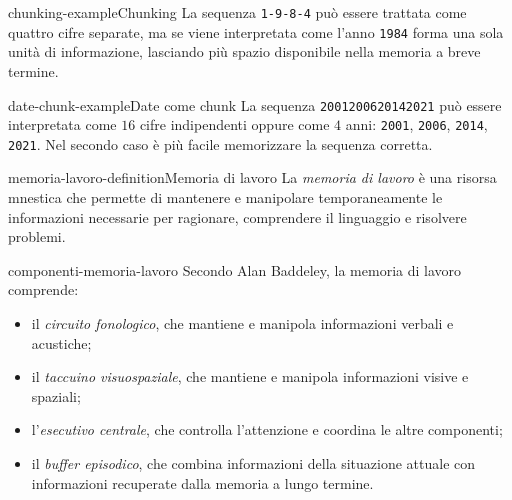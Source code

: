 \documentclass[preview]{standalone}
\begin{document}
\begin{snippetexample}{chunking-example}{Chunking}
    La sequenza \texttt{1-9-8-4} può essere trattata come quattro cifre
    separate, ma se viene interpretata come l'anno \texttt{1984} forma una sola
    unità di informazione, lasciando più spazio disponibile nella memoria a
    breve termine.
\end{snippetexample}

\begin{snippetexample}{date-chunk-example}{Date come chunk}
    La sequenza \texttt{2001200620142021} può essere interpretata come \(16\)
    cifre indipendenti oppure come \(4\) anni: \texttt{2001}, \texttt{2006},
    \texttt{2014}, \texttt{2021}. Nel secondo caso è più facile memorizzare la
    sequenza corretta.
\end{snippetexample}

\begin{snippetdefinition}{memoria-lavoro-definition}{Memoria di lavoro}
    La \emph{memoria di lavoro} è una risorsa mnestica che permette di mantenere
    e manipolare temporaneamente le informazioni necessarie per ragionare,
    comprendere il linguaggio e risolvere problemi.
\end{snippetdefinition}

\begin{snippet}{componenti-memoria-lavoro}
    Secondo Alan Baddeley, la memoria di lavoro comprende:
    \begin{itemize}
        \item il \emph{circuito fonologico}, che mantiene e manipola
        informazioni verbali e acustiche;
        \item il \emph{taccuino visuospaziale}, che mantiene e manipola
        informazioni visive e spaziali;
        \item l'\emph{esecutivo centrale}, che controlla l'attenzione e
        coordina le altre componenti;
        \item il \emph{buffer episodico}, che combina informazioni della
        situazione attuale con informazioni recuperate dalla memoria a lungo
        termine.
    \end{itemize}
\end{snippet}
\end{document}

